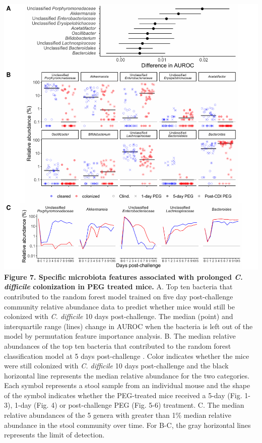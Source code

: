 \documentclass[
  11pt,
]{article}
\begin{document}
\newpage

\includegraphics{figure_7.pdf} \textbf{Figure 7. Specific microbiota
features associated with prolonged \emph{C. difficile} colonization in
PEG treated mice.} A. Top ten bacteria that contributed to the random
forest model trained on five day post-challenge community relative
abundance data to predict whether mice would still be colonized with
\emph{C. difficile} 10 days post-challenge. The median (point) and
interquartile range (lines) change in AUROC when the bacteria is left
out of the model by permutation feature importance analysis. B. The
median relative abundances of the top ten bacteria that contributed to
the random forest classification model at 5 days post-challenge . Color
indicates whether the mice were still colonized with \emph{C. difficile}
10 days post-challenge and the black horizontal line represents the
median relative abundance for the two categories. Each symbol represents
a stool sample from an individual mouse and the shape of the symbol
indicates whether the PEG-treated mice received a 5-day (Fig. 1-3),
1-day (Fig. 4) or post-challenge PEG (Fig. 5-6) treatment. C. The median
relative abundances of the 5 genera with greater than 1\% median
relative abundance in the stool community over time. For B-C, the gray
horizontal lines represents the limit of detection. \newpage
\end{document}
